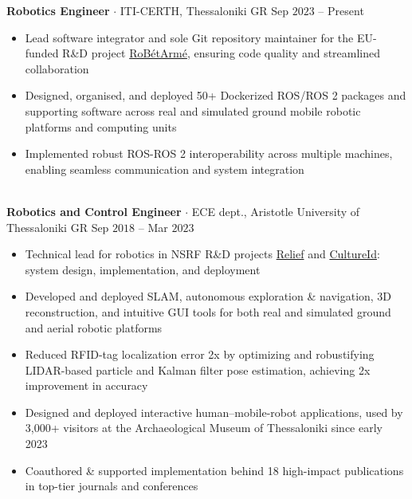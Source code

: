 \documentclass[a4paper,10pt,twoside]{article}
\begin{document}
  \noindent\textbf{Robotics Engineer} $\cdot$ ITI-CERTH, Thessaloniki GR \hfill {\small Sep $2023$ -- Present} \\
  \begin{minipage}[t]{\textwidth}
    \begin{itemize}
      \item Lead software integrator and sole Git repository maintainer for the EU-funded R\&D project \href{https://www.robetarme-project.eu/}{RoBétArmé}, ensuring code quality and streamlined collaboration\vspace{-0.8em}
      \item Designed, organised, and deployed 50+ Dockerized ROS/ROS 2 packages and supporting software across real and simulated ground mobile robotic platforms and computing units\vspace{-0.8em}
      \item Implemented robust ROS-ROS 2 interoperability across multiple machines, enabling seamless communication and system integration
    \end{itemize}
  \end{minipage} \\[0.4em]

  \noindent\textbf{Robotics and Control Engineer} $\cdot$ ECE dept., Aristotle University of Thessaloniki GR \hfill {\small Sep $2018$ -- Mar $2023$} \\
  \begin{minipage}[t]{\textwidth}
    \begin{itemize}
      \item Technical lead for robotics in NSRF R\&D projects \href{https://relief.web.auth.gr/language/en/home/}{Relief} and \href{https://cultureid.web.auth.gr/?page\_id=200&lang=en}{CultureId}: system design, implementation, and deployment \vspace{-0.8em}
      \item Developed and deployed SLAM, autonomous exploration \& navigation, 3D reconstruction, and intuitive GUI tools for both real and simulated ground and aerial robotic platforms \vspace{-0.8em}
      \item Reduced RFID-tag localization error 2x by optimizing and robustifying LIDAR-based particle and Kalman filter pose estimation, achieving 2x improvement in accuracy \vspace{-0.8em}
      \item Designed and deployed interactive human--mobile-robot applications, used by 3,000+ visitors at the Archaeological Museum of Thessaloniki since early 2023 \vspace{-0.8em}
      \item Coauthored \& supported implementation behind 18 high-impact publications in top-tier journals and conferences
    \end{itemize}
  \end{minipage} \\[0.4em]
\end{document}
